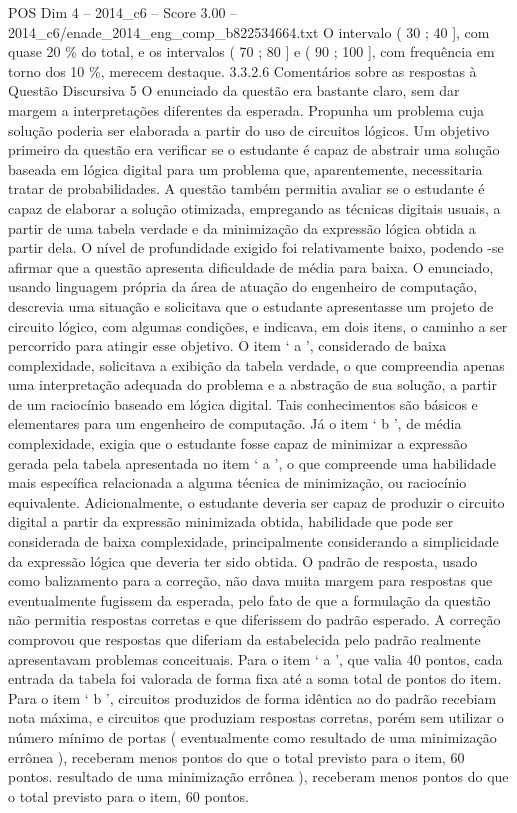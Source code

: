 \begin{textsample}{POS Dim 4 – 2014\_c6 – Score 3.00 – 2014\_c6/enade\_2014\_eng\_comp\_b822534664.txt}
O intervalo ( 30 ; 40 ], com quase 20 \% do total, e os intervalos ( 70 ; 80 ] e ( 90 ; 100 ], com frequência em torno dos 10 \%, merecem destaque. 3.3.2.6 Comentários sobre as respostas à Questão Discursiva 5 O enunciado da questão era bastante claro, sem dar margem a interpretações diferentes da esperada.
Propunha um problema cuja solução poderia ser elaborada a partir do uso de circuitos lógicos.
Um objetivo primeiro da questão era verificar se o estudante é capaz de abstrair uma solução baseada em lógica digital para um problema que, aparentemente, necessitaria tratar de probabilidades.
A questão também permitia avaliar se o estudante é capaz de elaborar a solução otimizada, empregando as técnicas digitais usuais, a partir de uma tabela verdade e da minimização da expressão lógica obtida a partir dela.
O nível de profundidade exigido foi relativamente baixo, podendo -se afirmar que a questão apresenta dificuldade de média para baixa.
O enunciado, usando linguagem própria da área de atuação do engenheiro de computação, descrevia uma situação e solicitava que o estudante apresentasse um projeto de circuito lógico, com algumas condições, e indicava, em dois itens, o caminho a ser percorrido para atingir esse objetivo.
O item ‘ a ’, considerado de baixa complexidade, solicitava a exibição da tabela verdade, o que compreendia apenas uma interpretação adequada do problema e a abstração de sua solução, a partir de um raciocínio baseado em lógica digital.
Tais conhecimentos são básicos e elementares para um engenheiro de computação.
Já o item ‘ b ’, de média complexidade, exigia que o estudante fosse capaz de minimizar a expressão gerada pela tabela apresentada no item ‘ a ’, o que compreende uma habilidade mais específica relacionada a alguma técnica de minimização, ou raciocínio equivalente.
Adicionalmente, o estudante deveria ser capaz de produzir o circuito digital a partir da expressão minimizada obtida, habilidade que pode ser considerada de baixa complexidade, principalmente considerando a simplicidade da expressão lógica que deveria ter sido obtida.
O padrão de resposta, usado como balizamento para a correção, não dava muita margem para respostas que eventualmente fugissem da esperada, pelo fato de que a formulação da questão não permitia respostas corretas e que diferissem do padrão esperado.
A correção comprovou que respostas que diferiam da estabelecida pelo padrão realmente apresentavam problemas conceituais.
Para o item ‘ a ’, que valia 40 pontos, cada entrada da tabela foi valorada de forma fixa até a soma total de pontos do item.
Para o item ‘ b ’, circuitos produzidos de forma idêntica ao do padrão recebiam nota máxima, e circuitos que produziam respostas corretas, porém sem utilizar o número mínimo de portas ( eventualmente como resultado de uma minimização errônea ), receberam menos pontos do que o total previsto para o item, 60 pontos. resultado de uma minimização errônea ), receberam menos pontos do que o total previsto para o item, 60 pontos.

\end{textsample}
